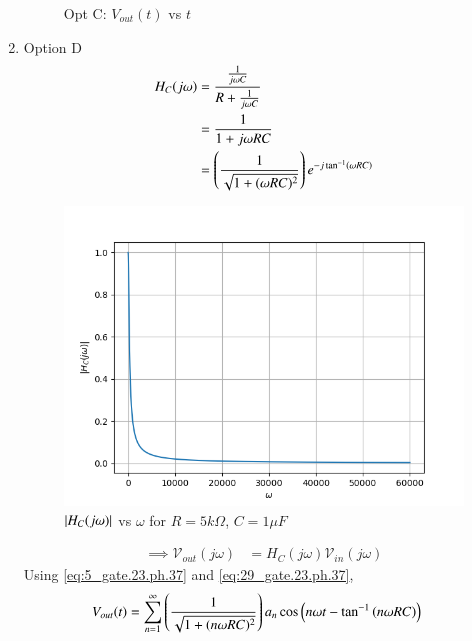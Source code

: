 \documentclass[journal,12pt,twocolumn]{IEEEtran}
\theoremstyle{remark}
\begin{document}
\begin{enumerate}
\begin{figure}[!h]
        \caption{Opt C: $V_{out}(t)$ vs $t$}
        \label{fig:opt_c_res_gate.ph.23.37}
    \end{figure}
    \item Option D
    \begin{align}
        H_C(j\omega) &=  \frac{\frac{1}{j\omega C}}{R + \frac{1}{j\omega C}}\\
        &= \frac{1}{1+j\omega RC}\\
        &= \left(\frac{1}{\sqrt{1 + (\omega R C)^2}}\right)e^{-j\tan^{-1}\left(\omega RC\right)}\label{eq:29_gate.23.ph.37}
    \end{align}
    \begin{figure}[!h]
        \centering
        \includegraphics[width=\columnwidth]{figs/opt_d_hf.png}
        \caption{$\left\vert H_C(j\omega)\right\vert$ vs $\omega$ for $R=5k\Omega$, $C=1\mu F$}
        \label{fig:opt_d_hf_gate.ph.23.37}
    \end{figure}
    \begin{align}
        \implies \mathcal{V}_{out}(j\omega) &= H_C(j\omega)\mathcal{V}_{in}(j\omega)
    \end{align}
    Using \eqref{eq:5_gate.23.ph.37} and  \eqref{eq:29_gate.23.ph.37},
    {\small
    \begin{align}
        V_{out}(t) &= \sum_{n=1}^{\infty}\left(\frac{1}{\sqrt{1 + (n\omega R C)^2}}\right)a_n\cos\left(n\omega t-\tan^{-1}\left(n\omega RC\right)\right)
    \end{align}
    }
    \begin{figure}[!h]
        \centering

\end{figure}
\end{enumerate}
\end{document}
